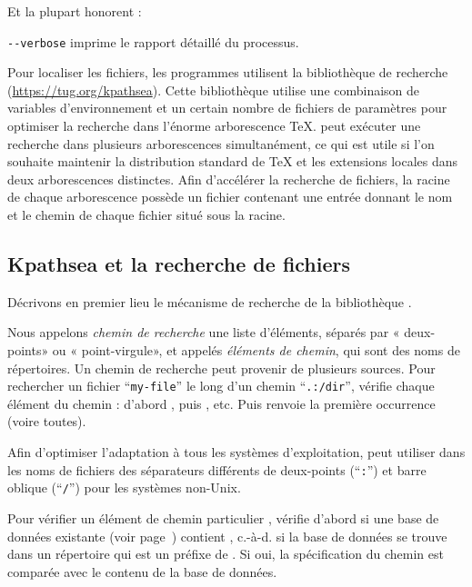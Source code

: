 \documentclass[german, english, french]{article}
\renewcommand{\samp}[1]{\enquote{\texttt{#1}}}
\begin{document}
Et la plupart honorent :
\begin{ttdescription}
\item[\texttt{-{}-verbose}] imprime le rapport détaillé du processus.
\end{ttdescription}

Pour localiser les fichiers, les programmes \Webc{} utilisent la bibliothèque de
recherche \KPS{} (\url{https://tug.org/kpathsea}). Cette bibliothèque utilise
une combinaison de variables d'environnement et un certain nombre de fichiers de
paramètres pour optimiser la recherche dans l'énorme arborescence \TeX{}.
\Webc{} peut exécuter une recherche dans plusieurs arborescences simultanément,
ce qui est utile si l'on souhaite maintenir la distribution standard de \TeX{}
et les extensions locales dans deux arborescences distinctes. Afin d'accélérer
la recherche de fichiers, la racine de chaque arborescence possède un fichier
 contenant une entrée donnant le nom et le chemin de chaque fichier
situé sous la racine.

\subsection{Kpathsea et la recherche de fichiers}
\label{sec:kpathsea}

Décrivons en premier lieu le mécanisme de recherche de la bibliothèque \KPS{}.

Nous appelons \emph{chemin de recherche} une liste d'éléments, séparés par
« deux-points» ou « point-virgule», et appelés \emph{éléments de chemin}, qui
sont des noms de répertoires.  Un chemin de recherche peut provenir de plusieurs
sources.  Pour rechercher un fichier \samp{my-file} le long d'un chemin
\samp{.:/dir}, \KPS{} vérifie chaque élément du chemin : d'abord
, puis , etc.  Puis \KPS{} renvoie la
première occurrence (voire toutes).

Afin d'optimiser l'adaptation à tous les systèmes d'exploitation, \KPS{} peut
utiliser dans les noms de fichiers des séparateurs différents de deux-points
(\samp{:}) et barre oblique (\samp{/}) pour les systèmes non-Unix.

Pour vérifier un élément de chemin particulier , \KPS{} vérifie d'abord
si une base de données existante (voir page~\pageref{sec:filename-database})
contient , c.-à-d. si la base de données se trouve dans un répertoire qui
est un préfixe de . Si oui, la spécification du chemin est comparée avec
le contenu de la base de données.
\end{document}
